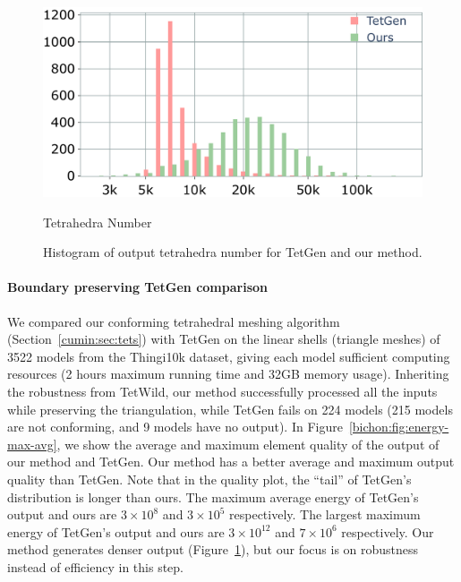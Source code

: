 \begin{figure}
    \centering
    \parbox{.7\linewidth}{\centering
    \parbox{0.02\linewidth}{\centering{}}\hfill
    \parbox{.95\linewidth}{\includegraphics[width=\linewidth]{curve_meshing_in_shell_tex/figs/stats/tetgen_TO}}\par
    \scriptsize{Tetrahedra Number}
    }
    \caption{Histogram of output tetrahedra number for TetGen and {our} method. }
    \label{bichon:fig:numt}
\end{figure}

\paragraph{Boundary preserving TetGen comparison}
We compared our conforming tetrahedral meshing algorithm (Section~\ref{cumin:sec:tets}) with TetGen on the linear shells (triangle meshes) of 3522 models from the Thingi10k dataset, giving each model sufficient computing resources (2 hours maximum running time and 32GB memory usage). Inheriting the robustness from TetWild, our method successfully processed all the inputs while preserving the triangulation, while TetGen fails on 224 models (215 models are not conforming, and 9 models have no output).  In Figure~\ref{bichon:fig:energy-max-avg}, we show the average and maximum element quality of the output of our method and TetGen. Our method has {a} better average and maximum output quality than TetGen. Note that in the quality plot, the ``tail'' of TetGen's distribution is longer than ours. The maximum average energy of TetGen's output and ours are $3\times 10^8$ and $3 \times 10^5$ respectively. The largest maximum energy of TetGen's output and ours are $3\times 10^{12}$ and $7 \times 10^6$ respectively. Our method generates denser output (Figure~\ref{bichon:fig:numt}), but our focus is on robustness instead of efficiency in this step.



